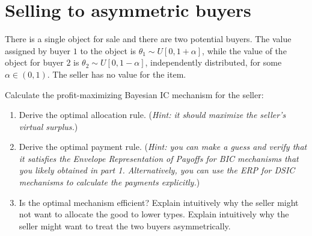 \documentclass[a4paper]{article}
\newif\ifsolutions
\begin{document}
\section{Selling to asymmetric buyers}
There is a single object for sale and there are two potential buyers. The value assigned by buyer $1$ to the object is $\theta_1\sim U[0,1+\alpha]$, while the value of the object for buyer $2$ is $\theta_2\sim U[0,1-\alpha]$, independently distributed, for some $\alpha\in(0,1)$. The seller has no value for the item.

Calculate the profit-maximizing Bayesian IC mechanism for the seller:
\begin{enumerate}
	\item Derive the optimal allocation rule. (\emph{Hint: it should maximize the seller's virtual surplus.})
	\item Derive the optimal payment rule. (\emph{Hint: you can make a guess and verify that it satisfies the Envelope Representation of Payoffs for BIC mechanisms that you likely obtained in part 1. Alternatively, you can use the ERP for DSIC mechanisms to calculate the payments explicitly.})
	\item Is the optimal mechanism efficient? Explain intuitively why the seller might not want to allocate the good to lower types. Explain intuitively why the seller might want to treat the two buyers asymmetrically.
\end{enumerate}



\ifsolutions
\end{document}
